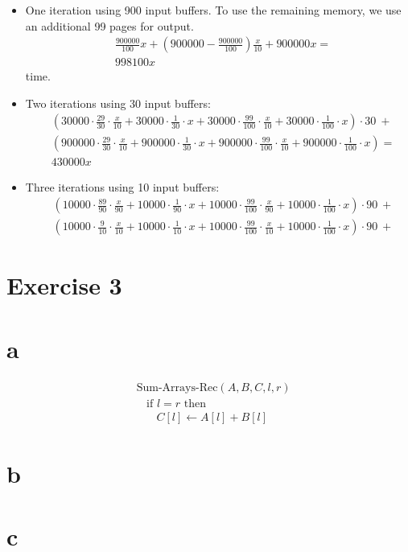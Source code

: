 \documentclass[koma,a4paper]{article}
\begin{document}
\begin{itemize}
  \item One iteration using 900 input buffers. To use the remaining memory, we use an additional 99 pages for output. \begin{align*}
      &\frac{900000}{100}x + \left(900000 - \frac{900000}{100}\right) \frac{x}{10} + 900000 x =\\
      &998100x
    \end{align*} time.
  \item Two iterations using 30 input buffers: \begin{align*}
    &\left(30000 \cdot \frac{29}{30} \cdot \frac{x}{10} + 30000 \cdot \frac{1}{30} \cdot x + 30000 \cdot \frac{99}{100} \cdot \frac{x}{10} + 30000 \cdot \frac{1}{100} \cdot x\right) \cdot 30~+\\
    &\left(900000 \cdot \frac{29}{30} \cdot \frac{x}{10} + 900000 \cdot \frac{1}{30} \cdot x + 900000 \cdot \frac{99}{100} \cdot \frac{x}{10} + 900000 \cdot \frac{1}{100} \cdot x\right) =\\ &430000x
  \end{align*}
  \item Three iterations using 10 input buffers: \begin{align*}
    &\left(10000 \cdot \frac{89}{90} \cdot \frac{x}{90} + 10000 \cdot \frac{1}{90} \cdot x + 10000 \cdot \frac{99}{100} \cdot \frac{x}{90} + 10000 \cdot \frac{1}{100} \cdot x\right) \cdot 90~+\\
    &\left(10000 \cdot \frac{9}{10} \cdot \frac{x}{10} + 10000 \cdot \frac{1}{10} \cdot x + 10000 \cdot \frac{99}{100} \cdot \frac{x}{10} + 10000 \cdot \frac{1}{100} \cdot x\right) \cdot 90~+
  \end{align*}
\end{itemize}

\section{Exercise 3}

\section{a}
\begin{align*}
  &\text{Sum-Arrays-Rec}(A, B, C, l, r)\\
  &~~~~\text{if } l = r \text{ then}\\
  &~~~~~~~~C[l] \leftarrow A[l] + B[l]
\end{align*}

\section{b}

\section{c}
\end{document}
